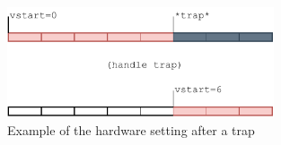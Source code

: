 \begin{figure}
    \centering
    \includegraphics[width=0.7\textwidth]{Figures/RVV_vstart_trap.pdf}
    \caption{Example of the hardware setting  after a trap}
    \label{fig:RVV_vstart_trap}
\end{figure}